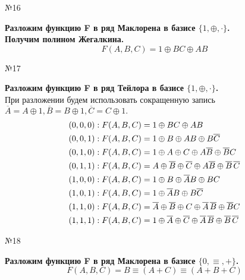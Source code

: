 \documentclass[]{article}
\begin{document}
	\begin{center}\begin{large}{№16}\end{large}\end{center}
	\textbf{Разложим функцию F в ряд Маклорена в базисе $\{1,\oplus,\cdot\}$.\\
		Получим полином Жегалкина.}
	\begin{equation}
		F(A,B,C)=1\oplus BC\oplus AB
	\end{equation}
	
	\begin{center}\begin{large}{№17}\end{large}\end{center}
	\textbf{Разложим функцию F в ряд Тейлора в базисе $\{1,\oplus,\cdot\}$.\\}
	При разложении будем использовать сокращенную запись $\overline{A}=A\oplus 1,\overline{B} = B\oplus1,\overline{C}=C\oplus1.$
	\begin{align*}
	(0,0,0):F(A,B,C)&=1\oplus BC\oplus AB\\
	(0,0,1):F(A,B,C)&=1\oplus B\oplus AB\oplus B\overline{C}\\
	(0,1,0):F(A,B,C)&=1\oplus A\oplus C\oplus A\overline{B}\oplus \overline{B}C\\
	(0,1,1):F(A,B,C)&=A\oplus \overline{B}\oplus \overline{C}\oplus A\overline{B}\oplus\overline{B} \hspace{1,5pt} \overline{C}\\
	(1,0,0):F(A,B,C)&=1\oplus B\oplus\overline{A}B\oplus BC\\
	(1,0,1):F(A,B,C)&=1\oplus\overline{A}B\oplus B\overline{C}\\
	(1,1,0):F(A,B,C)&=\overline{A}\oplus\overline{B}\oplus C\oplus\overline{A}\hspace{1,5pt}\overline{B}\oplus\overline{B}C\\
	(1,1,1):F(A,B,C)&=1\oplus\overline{A}\oplus\overline{C}\oplus\overline{A}\hspace{1,5pt}\overline{B}\oplus\overline{B}\hspace{1,5pt}\overline{C}\\
	\end{align*}
	\newpage
	\begin{center}\begin{large}{№18}\end{large}\end{center}
	\textbf{Разложим функцию F в ряд Маклорена в базисе $\{0,\equiv,+\}$.}
	\begin{equation}
	F(A,B,C)=B\equiv(A+C)\equiv(A+B+C)
	\end{equation}
\end{document}
